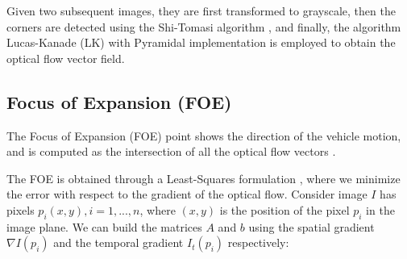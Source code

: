 \documentclass[letterpaper, 10 pt, conference]{ieeeconf}  %
\begin{document}



Given two subsequent images, they are first transformed to grayscale, then the corners are detected using the Shi-Tomasi algorithm \cite{shi1993good}, and finally, the algorithm Lucas-Kanade (LK) with Pyramidal implementation \cite{bouguet2001pyramidal} is employed to obtain the optical flow vector field.


\subsection{Focus of Expansion (FOE)}

The Focus of Expansion (FOE) point shows the direction of the vehicle motion, and is computed as the intersection of all the optical flow vectors \cite{okafuji2015development}.

The FOE is obtained through a Least-Squares formulation \cite{okafuji2015development}, where we minimize the error with respect to the gradient of the optical flow. Consider image $I$ has pixels $p_i(x,y),i=1,...,n$, where $(x,y)$ is the position of the pixel $p_i$ in the image plane. We can build the matrices $A$ and $b$ using the spatial gradient $\nabla I(p_i)$ and the temporal gradient $I_t(p_i)$ respectively:
\end{document}
